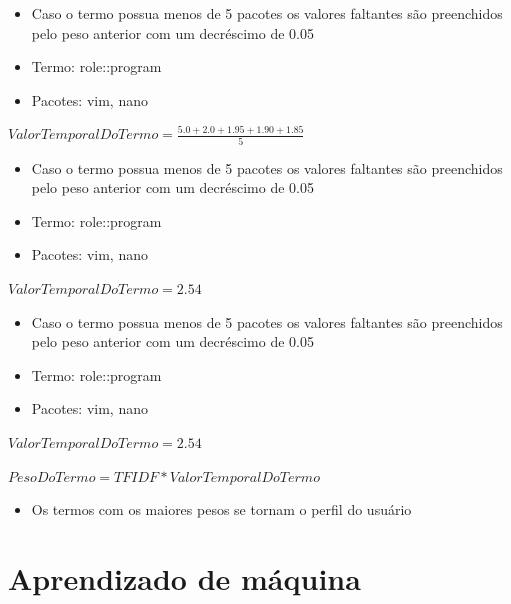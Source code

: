 \begin{frame}
    \begin{itemize}
        \item Caso o termo possua menos de 5 pacotes os valores faltantes são
    preenchidos pelo peso anterior com um decréscimo de 0.05
        \item Termo: role::program
        \item Pacotes: vim, nano
    \end{itemize}

    $ValorTemporalDoTermo = \frac{5.0 + 2.0 + 1.95 + 1.90 + 1.85}{5}$
\end{frame}

\begin{frame}
    \begin{itemize}
        \item Caso o termo possua menos de 5 pacotes os valores faltantes são
    preenchidos pelo peso anterior com um decréscimo de 0.05
        \item Termo: role::program
        \item Pacotes: vim, nano
    \end{itemize}

    $ValorTemporalDoTermo = 2.54$
\end{frame}

\begin{frame}
    \begin{itemize}
        \item Caso o termo possua menos de 5 pacotes os valores faltantes são
    preenchidos pelo peso anterior com um decréscimo de 0.05
        \item Termo: role::program
        \item Pacotes: vim, nano
    \end{itemize}

    $ValorTemporalDoTermo = 2.54$

    $PesoDoTermo = TFIDF * ValorTemporalDoTermo$
\end{frame}

\begin{frame}
    \begin{itemize}
        \item Os termos com os maiores pesos se tornam o perfil do usuário
    \end{itemize}
\end{frame}


\section{Aprendizado de máquina} %

